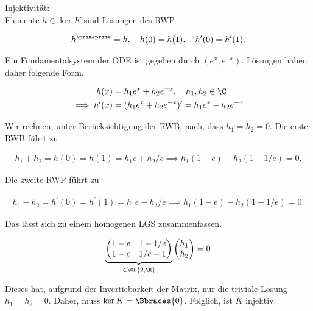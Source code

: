 \begin{solution}

\underline{Injektivität:} \\

Elemente $h \in \ker{K}$ sind Lösungen des RWP

\begin{align*}
  h^\primeprime = h,
  \quad
  h(0) = h(1),
  \quad
  h^\prime(0) = h^\prime(1).
\end{align*}

Ein Fundamentalsystem der ODE ist gegeben durch $(e^x, e^{-x})$.
Lösungen haben daher folgende Form.

\begin{align*}
  h(x)
  & =
  h_1 e^x + h_2 e^{-x},
  \quad
  h_1, h_2 \in \C \\
  \implies
  h^\prime(x)
  & =
  (h_1 e^x + h_2 e^{-x})^\prime
  =
  h_1 e^x - h_2 e^{-x}
\end{align*}

Wir rechnen, unter Berücksichtigung der RWB, nach, dass $h_1 = h_2 = 0$.
Die erste RWB führt zu

\begin{align*}
  h_1 + h_2
  =
  h(0)
  =
  h(1)
  =
  h_1 e + h_2 / e
  \implies
  h_1 (1 - e) + h_2 (1 - 1/e) = 0.
\end{align*}

Die zweite RWP führt zu

\begin{align*}
  h_1 - h_2
  =
  h^\prime(0)
  =
  h^\prime(1)
  =
  h_1 e - h_2 / e
  \implies
  h_1 (1 - e) - h_2 (1 - 1/e) = 0.
\end{align*}

Das lässt sich zu einem homogenen LGS zusammenfassen.

\begin{align*}
  \underbrace
  {
    \begin{pmatrix}
    1 - e & 1 - 1/e \\
    1 - e & 1/e - 1
    \end{pmatrix}
  }_{\in \GL{2, \R}}
  \begin{pmatrix}
    h_1 \\ h_2
  \end{pmatrix}
  = 0
\end{align*}

Dieses hat, aufgrund der Invertiebarkeit der Matrix, nur die triviale Lösung $h_1 = h_2 = 0$.
Daher, muss $\ker{K} = \Bbraces{0}$.
Folglich, ist $K$ injektiv.

\end{solution}

